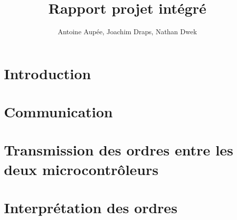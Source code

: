 \documentclass[a4paper, 11pt, frenchb]{report}
\title{Rapport projet intégré}
\author{Antoine Aupée, Joachim Draps, Nathan Dwek}
\begin{document}

\setcounter{page}{2}
\tableofcontents

\chapter{Introduction}


\chapter{Communication}


\chapter{Transmission des ordres entre les deux microcontrôleurs}


\chapter{Interprétation des ordres}


\listoffigures
\setcounter{page}{1}

\listoflistings
{}
\end{document}
